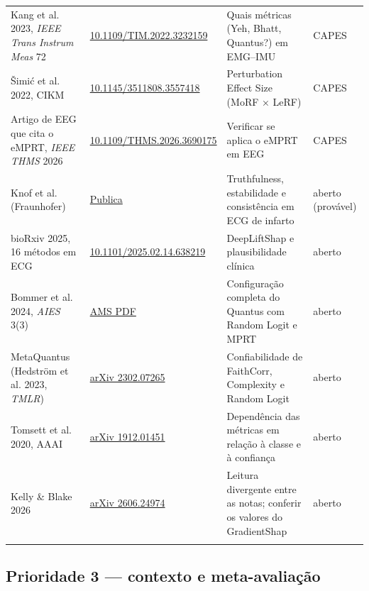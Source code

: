 \documentclass[11pt,a4paper]{article}
\begin{document}
{\begin{xltabular}{\linewidth}{>{\raggedright\arraybackslash}X>{\raggedright\arraybackslash}X>{\raggedright\arraybackslash}X>{\raggedright\arraybackslash}X}
Kang et al. 2023, \textit{IEEE Trans Instrum Meas} 72 & \href{https://www.aminer.org/pub/63aa20f090e50fcafd47f41d/reduce-system-redundancy-and-optimize-sensor-disposition-for-emg-imu-multimodal-fusion}{10.1109/TIM.2022.3232159} & Quais métricas (Yeh, Bhatt, Quantus?) em EMG–IMU & CAPES \\ \addlinespace[1pt]
Šimić et al. 2022, CIKM & \href{https://graz.elsevierpure.com/en/publications/perturbation-effect-a-metric-to-counter-misleading-validation-of-}{10.1145/3511808.3557418} & Perturbation Effect Size (MoRF × LeRF) & CAPES \\ \addlinespace[1pt]
Artigo de EEG que cita o eMPRT, \textit{IEEE THMS} 2026 & \href{https://api.semanticscholar.org/graph/v1/paper/arXiv:2401.06465/citations}{10.1109/THMS.2026.3690175} & Verificar se aplica o eMPRT em EEG & CAPES \\ \addlinespace[1pt]
Knof et al. (Fraunhofer) & \href{https://publica.fraunhofer.de/handle/publica/472815}{Publica} & Truthfulness, estabilidade e consistência em ECG de infarto & aberto (provável) \\ \addlinespace[1pt]
bioRxiv 2025, 16 métodos em ECG & \href{https://doi.org/10.1101/2025.02.14.638219}{10.1101/2025.02.14.638219} & DeepLiftShap e plausibilidade clínica & aberto \\ \addlinespace[1pt]
Bommer et al. 2024, \textit{AIES} 3(3) & \href{https://journals.ametsoc.org/view/journals/aies/3/3/AIES-D-23-0074.1.pdf}{AMS PDF} & Configuração completa do Quantus com Random Logit e MPRT & aberto \\ \addlinespace[1pt]
MetaQuantus (Hedström et al. 2023, \textit{TMLR}) & \href{https://arxiv.org/abs/2302.07265}{arXiv 2302.07265} & Confiabilidade de FaithCorr, Complexity e Random Logit & aberto \\ \addlinespace[1pt]
Tomsett et al. 2020, AAAI & \href{https://arxiv.org/abs/1912.01451}{arXiv 1912.01451} & Dependência das métricas em relação à classe e à confiança & aberto \\ \addlinespace[1pt]
Kelly \& Blake 2026 & \href{https://arxiv.org/html/2606.24974}{arXiv 2606.24974} & Leitura divergente entre as notas; conferir os valores do GradientShap & aberto \\ \addlinespace[1pt]
\bottomrule
\end{xltabular}}


\subsection{Prioridade 3 — contexto e meta-avaliação}
\end{document}
